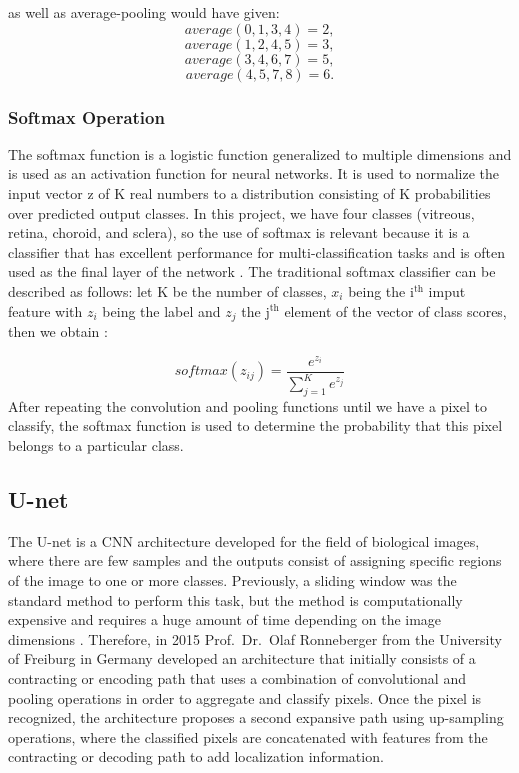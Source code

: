 \documentclass[12pt,a4paper]{scrartcl}
\begin{document}
as well as average-pooling would have given:
\[average (0, 1, 3, 4) = 2,\]
\[average (1, 2, 4, 5) = 3,\]
\[average (3, 4, 6, 7) = 5,\]
\[average (4, 5, 7, 8) = 6.\]

\subsubsection{Softmax Operation}\label{tech:softmax}
The softmax function is a logistic function generalized to multiple dimensions and is used as an activation function for neural networks. It is used to normalize the input vector z of K real numbers to a distribution consisting of K probabilities over predicted output classes. In this project, we have four classes (vitreous, retina, choroid, and sclera), so the use of softmax is relevant because it is a classifier that has excellent performance for multi-classification tasks and is often used as the final layer of the network \cite{SoftMaxClassification}. 
The traditional softmax classifier can be described as follows: let K be the number of classes, \(x_i\) being the i$^\mathrm{th}$ imput feature with \(z_i\) being the label and \(z_j\) the j$^\mathrm{th}$ element of the vector of class scores, then we obtain \cite{SoftMaxClassification, DIDLBook}:

\begin{equation}
softmax(z_{ij}) = \frac{e^{z_i}}{\sum_{j=1}^{K} e^{z_j}}
\end{equation}
After repeating the convolution and pooling functions until we have a pixel to classify,  the softmax function is used to determine the probability that this pixel belongs to a particular class.

\subsection{U-net}\label{tech:unet}

The U-net is a CNN architecture developed for the field of biological images,  where there are few samples and the outputs consist of assigning specific regions of the image to one or more classes. Previously, a sliding window was the standard method to perform this task, but the method is computationally expensive and requires a huge amount of time depending on the image dimensions \cite{Ronneberger2015}. Therefore, in 2015 Prof.~Dr.~Olaf Ronneberger from the University of Freiburg in Germany developed an architecture that initially consists of a contracting or encoding path that uses a combination of convolutional and pooling operations in order to aggregate and classify pixels. Once the pixel is recognized, the architecture proposes a second expansive path using up-sampling operations, where the classified pixels are concatenated with features from the contracting or decoding path to add localization information. 
\end{document}
